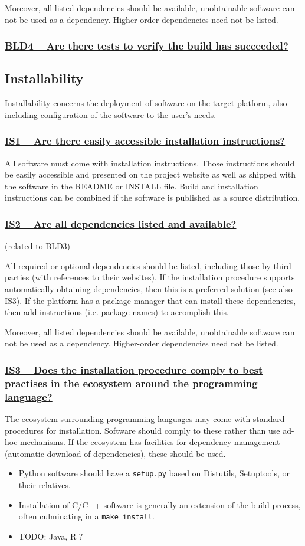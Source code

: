 \documentclass[a4paper,11pt]{article}
\newcommand{\criterion}[1]{\subsubsection*{\underline{#1}}}
\begin{document}
Moreover, all listed dependencies should be available, unobtainable software
can not be used as a dependency. Higher-order dependencies need not be listed.

\criterion{BLD4 -- Are there tests to verify the build has succeeded?}


\subsection{Installability}

Installability concerns the deployment of software on the target platform, also
including configuration of the software to the user's needs.

\criterion{IS1 -- Are there easily accessible installation instructions?}

All software must come with installation instructions. Those instructions should
be easily accessible and presented on the project website as well as shipped
with the software in the README or INSTALL file. Build and installation
instructions can be combined if the software is published as a source
distribution.

\criterion{IS2 -- Are all dependencies listed and available?}
(related to BLD3)

All required or optional dependencies should be listed, including those by
third parties (with references to their websites). If the installation
procedure supports automatically obtaining dependencies, then this is a
preferred solution (see also IS3). If the platform has a package manager that
can install these dependencies, then add instructions (i.e. package names) to
accomplish this.

Moreover, all listed dependencies should be available, unobtainable software
can not be used as a dependency. Higher-order dependencies need not be listed.

\criterion{IS3 -- Does the installation procedure comply to best practises
in the ecosystem around the programming language?}

The ecosystem surrounding programming languages may come with standard
procedures for installation. Software should comply to these rather than use
ad-hoc mechanisms. If the ecosystem has facilities for dependency management
(automatic download of dependencies), these should be used.

\begin{itemize}
 \item Python software should have a \texttt{setup.py} based on Distutils,
     Setuptools, or their relatives.
 \item Installation of C/C++ software is generally an extension of the build
     process, often culminating in a \texttt{make install}.
 \item TODO: Java, R ?
\end{itemize}
\end{document}
